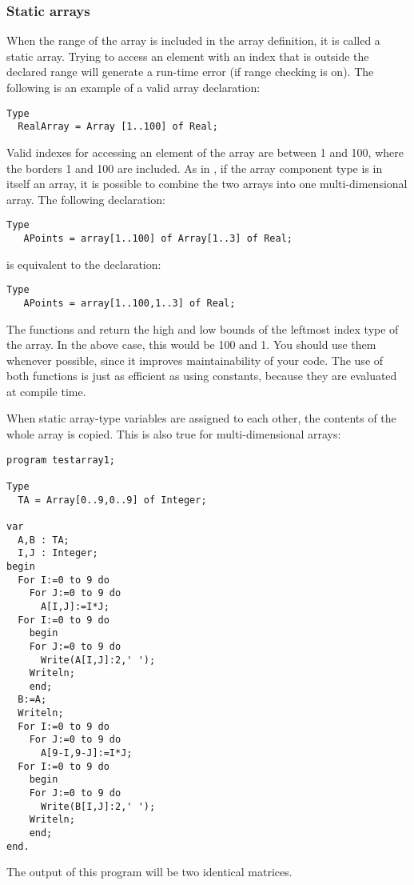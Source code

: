 \subsubsection{Static arrays}
 
When the range of the array is included in the array definition, it is
called a static array. Trying to access an element with an index that is
outside the declared range will generate a run-time error (if range checking
is on).  The following is an example of a valid array declaration:
\begin{verbatim}
Type
  RealArray = Array [1..100] of Real;
\end{verbatim}
Valid indexes for accessing an element of the array are between 1 and 100,
where the borders 1 and 100 are included.
As in \tp, if the array component type is in itself an array, it is
possible to combine the two arrays into one multi-dimensional array. The
following declaration:
\begin{verbatim}
Type
   APoints = array[1..100] of Array[1..3] of Real;
\end{verbatim}
is equivalent to the declaration:
\begin{verbatim}
Type
   APoints = array[1..100,1..3] of Real;
\end{verbatim}
The functions  and  return the high and low bounds of
the leftmost index type of the array. In the above case, this would be 100
and 1. You should use them whenever possible, since it improves maintainability
of your code. The use of both functions is just as efficient as using
constants, because they are evaluated at compile time.

When static array-type variables are assigned to each other, the contents of the
whole array is copied. This is also true for multi-dimensional arrays:
\begin{verbatim}
program testarray1;

Type
  TA = Array[0..9,0..9] of Integer;

var
  A,B : TA;
  I,J : Integer;
begin
  For I:=0 to 9 do
    For J:=0 to 9 do
      A[I,J]:=I*J;
  For I:=0 to 9 do
    begin
    For J:=0 to 9 do
      Write(A[I,J]:2,' ');
    Writeln;
    end;
  B:=A;
  Writeln;
  For I:=0 to 9 do
    For J:=0 to 9 do
      A[9-I,9-J]:=I*J;
  For I:=0 to 9 do
    begin
    For J:=0 to 9 do
      Write(B[I,J]:2,' ');
    Writeln;
    end;
end.
\end{verbatim}
The output of this program will be two identical matrices.

